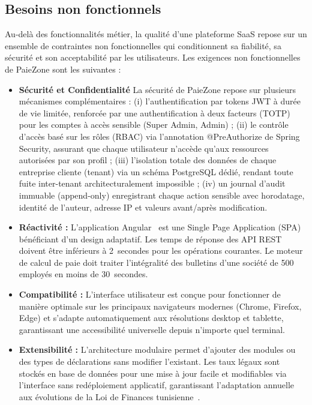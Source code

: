 \renewcommand{\arraystretch}{1.0}

\subsection{Besoins non fonctionnels}

Au-delà des fonctionnalités métier, la qualité d'une plateforme SaaS repose sur un ensemble de contraintes non fonctionnelles qui conditionnent sa fiabilité, sa sécurité et son acceptabilité par les utilisateurs. Les exigences non fonctionnelles de PaieZone sont les suivantes :

\begin{itemize}[label=\textbullet, leftmargin=*, itemsep=6pt, topsep=6pt, parsep=0pt]
    
    \item \textbf{Sécurité et Confidentialité } La sécurité de PaieZone repose sur plusieurs mécanismes complémentaires : (i)
  l'authentification par tokens JWT à durée de vie limitée, renforcée par une authentification à deux facteurs (TOTP)
  pour les comptes à accès sensible (Super Admin, Admin) ; (ii) le contrôle d'accès basé sur les rôles (RBAC) via
  l'annotation @PreAuthorize de Spring Security, assurant que chaque utilisateur n'accède qu'aux ressources
  autorisées par son profil ; (iii) l'isolation totale des données de chaque entreprise cliente (tenant) via un
  schéma PostgreSQL dédié, rendant toute fuite inter-tenant architecturalement impossible ; (iv) un journal d'audit
  immuable (append-only) enregistrant chaque action sensible avec horodatage, identité de l'auteur, adresse IP et
  valeurs avant/après modification.

    \item \textbf{Réactivité :} L'application Angular~\cite{angular} est une Single Page Application (SPA) bénéficiant d'un design adaptatif. Les temps de réponse des API REST doivent être inférieurs à 2~secondes pour les opérations courantes. Le moteur de calcul de paie doit traiter l'intégralité des bulletins d'une société de 500 employés en moins de 30~secondes.
    
    \item \textbf{Compatibilité :} L'interface utilisateur est conçue pour fonctionner de manière optimale sur les principaux navigateurs modernes (Chrome, Firefox, Edge) et s'adapte automatiquement aux résolutions desktop et tablette, garantissant une accessibilité universelle depuis n'importe quel terminal.
    
    \item \textbf{Extensibilité :} L'architecture modulaire permet d'ajouter des modules ou des types de déclarations sans modifier l'existant. Les taux légaux sont stockés en base de données pour une mise à jour facile et modifiables via l'interface sans redéploiement applicatif, garantissant l'adaptation annuelle aux évolutions de la Loi de Finances tunisienne~\cite{loifinance}.
    

\end{itemize}
